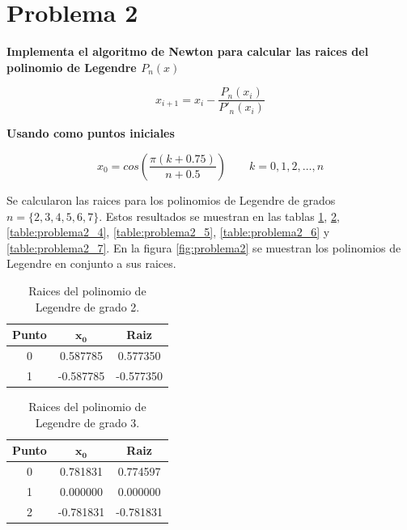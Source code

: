 \section*{Problema 2}

\textbf{Implementa el algoritmo de Newton para calcular las raices del polinomio de Legendre $P_n(x)$}

\begin{equation*}
    x_{i+1} = x_i - \frac{P_n(x_i)}{P'_n(x_i)}
\end{equation*}

\textbf{Usando como puntos iniciales}

\begin{equation*}
    x_0 = cos \left (\frac{\pi(k+0.75)}{n+0.5}\right ) \qquad k=0,1,2,\dots,n
\end{equation*}

Se calcularon las raices para los polinomios de Legendre de grados $n=\{2,3,4,5,6,7\}$. Estos resultados se muestran en las tablas \ref{table:problema2_2}, \ref{table:problema2_3}, \ref{table:problema2_4}, \ref{table:problema2_5}, \ref{table:problema2_6} y \ref{table:problema2_7}. En la figura \ref{fig:problema2} se muestran los polinomios de Legendre en conjunto a sus raices.

\begin{table}[H]
    \centering
    \begin{tabular}{ccc} \hline
        \textbf{Punto} & $\mathbf{x_0}$ & \textbf{Raiz} \\ \hline
        0              & 0.587785       & 0.577350      \\
        1              & -0.587785      & -0.577350     \\ \hline
    \end{tabular}
    \caption{Raices del polinomio de Legendre de grado 2.}
    \label{table:problema2_2}
\end{table}

\begin{table}[H]
    \centering
    \begin{tabular}{ccc} \hline
        \textbf{Punto} & $\mathbf{x_0}$ & \textbf{Raiz} \\ \hline
        0              & 0.781831       & 0.774597      \\
        1              & 0.000000       & 0.000000      \\
        2              & -0.781831      & -0.781831     \\  \hline
    \end{tabular}
    \caption{Raices del polinomio de Legendre de grado 3.}
    \label{table:problema2_3}
\end{table}

